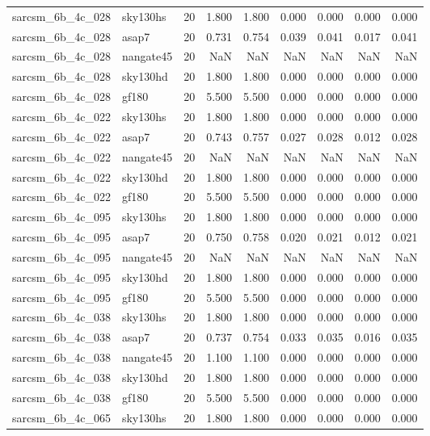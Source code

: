\begin{tabular}{llrrrrrrr}
sarcsm\_6b\_4c\_028 & sky130hs & 20 & 1.800 & 1.800 & 0.000 & 0.000 & 0.000 & 0.000 \\
sarcsm\_6b\_4c\_028 & asap7 & 20 & 0.731 & 0.754 & 0.039 & 0.041 & 0.017 & 0.041 \\
sarcsm\_6b\_4c\_028 & nangate45 & 20 & NaN & NaN & NaN & NaN & NaN & NaN \\
sarcsm\_6b\_4c\_028 & sky130hd & 20 & 1.800 & 1.800 & 0.000 & 0.000 & 0.000 & 0.000 \\
sarcsm\_6b\_4c\_028 & gf180 & 20 & 5.500 & 5.500 & 0.000 & 0.000 & 0.000 & 0.000 \\
sarcsm\_6b\_4c\_022 & sky130hs & 20 & 1.800 & 1.800 & 0.000 & 0.000 & 0.000 & 0.000 \\
sarcsm\_6b\_4c\_022 & asap7 & 20 & 0.743 & 0.757 & 0.027 & 0.028 & 0.012 & 0.028 \\
sarcsm\_6b\_4c\_022 & nangate45 & 20 & NaN & NaN & NaN & NaN & NaN & NaN \\
sarcsm\_6b\_4c\_022 & sky130hd & 20 & 1.800 & 1.800 & 0.000 & 0.000 & 0.000 & 0.000 \\
sarcsm\_6b\_4c\_022 & gf180 & 20 & 5.500 & 5.500 & 0.000 & 0.000 & 0.000 & 0.000 \\
sarcsm\_6b\_4c\_095 & sky130hs & 20 & 1.800 & 1.800 & 0.000 & 0.000 & 0.000 & 0.000 \\
sarcsm\_6b\_4c\_095 & asap7 & 20 & 0.750 & 0.758 & 0.020 & 0.021 & 0.012 & 0.021 \\
sarcsm\_6b\_4c\_095 & nangate45 & 20 & NaN & NaN & NaN & NaN & NaN & NaN \\
sarcsm\_6b\_4c\_095 & sky130hd & 20 & 1.800 & 1.800 & 0.000 & 0.000 & 0.000 & 0.000 \\
sarcsm\_6b\_4c\_095 & gf180 & 20 & 5.500 & 5.500 & 0.000 & 0.000 & 0.000 & 0.000 \\
sarcsm\_6b\_4c\_038 & sky130hs & 20 & 1.800 & 1.800 & 0.000 & 0.000 & 0.000 & 0.000 \\
sarcsm\_6b\_4c\_038 & asap7 & 20 & 0.737 & 0.754 & 0.033 & 0.035 & 0.016 & 0.035 \\
sarcsm\_6b\_4c\_038 & nangate45 & 20 & 1.100 & 1.100 & 0.000 & 0.000 & 0.000 & 0.000 \\
sarcsm\_6b\_4c\_038 & sky130hd & 20 & 1.800 & 1.800 & 0.000 & 0.000 & 0.000 & 0.000 \\
sarcsm\_6b\_4c\_038 & gf180 & 20 & 5.500 & 5.500 & 0.000 & 0.000 & 0.000 & 0.000 \\
sarcsm\_6b\_4c\_065 & sky130hs & 20 & 1.800 & 1.800 & 0.000 & 0.000 & 0.000 & 0.000 \\

\end{tabular}

